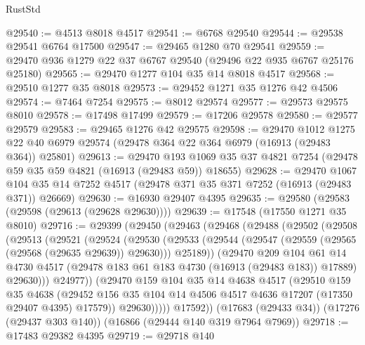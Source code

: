 \begin{lexlean}{RustStd}
\begin{coremodule}
@29540 := @4513 @8018 @4517
@29541 := @6768 @29540
@29544 := @29538 @29541 @6764 @17500
@29547 := @29465 @1280 @70 @29541
@29559 := @29470 @936 @1279 @22 @37 @6767 @29540 (@29496 @22 @935 @6767 @25176 @25180)
@29565 := @29470 @1277 @104 @35 @14 @8018 @4517
@29568 := @29510 @1277 @35 @8018
@29573 := @29452 @1271 @35 @1276 @42 @4506
@29574 := @7464 @7254
@29575 := @8012 @29574
@29577 := @29573 @29575 @8010
@29578 := @17498 @17499
@29579 := @17206 @29578
@29580 := @29577 @29579
@29583 := @29465 @1276 @42 @29575
@29598 := @29470
    @1012
    @1275
    @22
    @40
    @6979
    @29574
    (@29478 @364 @22 @364 @6979 (@16913 (@29483 @364)) @25801)
@29613 := @29470
    @193
    @1069
    @35
    @37
    @4821
    @7254
    (@29478 @59 @35 @59 @4821 (@16913 (@29483 @59)) @18655)
@29628 := @29470
    @1067
    @104
    @35
    @14
    @7252
    @4517
    (@29478 @371 @35 @371 @7252 (@16913 (@29483 @371)) @26669)
@29630 := @16930 @29407 @4395
@29635 := @29580 (@29583 (@29598 (@29613 (@29628 @29630))))
@29639 := @17548 (@17550 @1271 @35 @8010)
@29716 := @29399
    (@29450
      (@29463
        (@29468
          (@29488
            (@29502
              (@29508
                (@29513
                  (@29521
                    (@29524
                      (@29530
                        (@29533
                          (@29544
                            (@29547 (@29559 (@29565 (@29568 (@29635 @29639)) @29630)))
                            @25189))
                        (@29470
                          @209
                          @104
                          @61
                          @14
                          @4730
                          @4517
                          (@29478 @183 @61 @183 @4730 (@16913 (@29483 @183)) @17889)
                          @29630)))
                    @24977))
                (@29470
                  @159
                  @104
                  @35
                  @14
                  @4638
                  @4517
                  (@29510
                    @159
                    @35
                    @4638
                    (@29452
                      @156
                      @35
                      @104
                      @14
                      @4506
                      @4517
                      @4636
                      @17207
                      (@17350 @29407 @4395)
                      @17579))
                  @29630)))))
        @17592))
    (@17683 (@29433 @34))
    (@17276 (@29437 @303 @140))
    (@16866 (@29444 @140 @319 @7964 @7969))
@29718 := @17483 @29382 @4395
@29719 := @29718 @140

\end{coremodule}
\end{lexlean}
